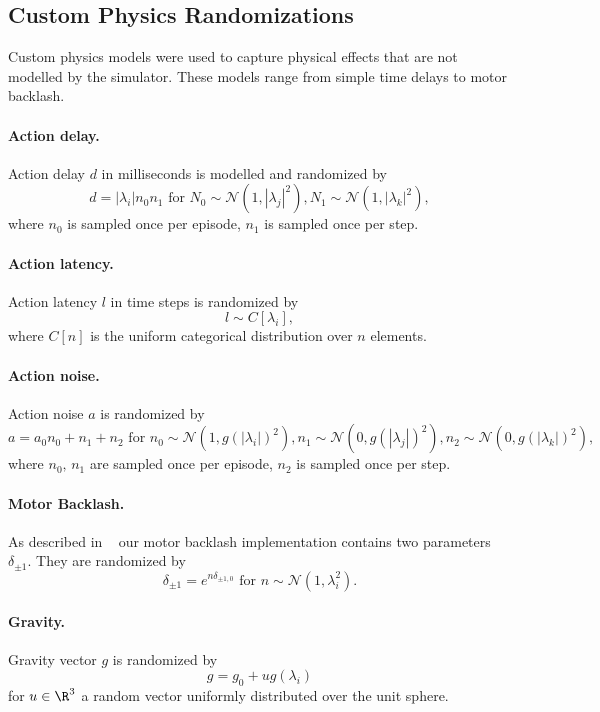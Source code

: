 \subsection{Custom Physics Randomizations}\label{sec:custom_physics}
Custom physics models were used to capture physical effects that are not modelled by the simulator. These models range from simple time delays to motor backlash.

\paragraph{Action delay.} Action delay $d$ in milliseconds is modelled and randomized by
\[
d = |\lambda_i| n_0 n_1 \textrm{ for } N_0 \sim \mathcal{N}(1, |\lambda_j|^2), N_1 \sim \mathcal{N}(1, |\lambda_k|^2),
\]
where $n_0$ is sampled once per episode, $n_1$ is sampled once per step.

\paragraph{Action latency.} Action latency $l$ in time steps is randomized by
\[
l \sim C[\lambda_i],
\]
where $C[n]$ is the uniform categorical distribution over $n$ elements.

\paragraph{Action noise.} Action noise $a$ is randomized by 
\[
a = a_0n_0 + n_1 + n_2 \textrm{ for } n_0 \sim \mathcal{N}(1, g(|\lambda_i|)^2), n_1 \sim \mathcal{N}(0, g(|\lambda_j|)^2), n_2 \sim \mathcal{N}(0, g(|\lambda_k|)^2),
\]
where $n_0,\, n_1$ are sampled once per episode, $n_2$ is sampled once per step.

\paragraph{Motor Backlash.} As described in ~\citep[C.2]{openai2018learning} our motor backlash implementation contains two parameters $\delta_{\pm 1}$. They are randomized by 
\[
\delta_{\pm1} = e^{n\delta_{\pm1, 0}} \textrm{ for } n \sim \mathcal{N}(1, \lambda_i^2).
\]

\paragraph{Gravity.} Gravity vector $g$ is randomized by
\[
g = g_0 + ug(\lambda_i)
\]
for $u \in \R^3$ a random vector uniformly distributed over the unit sphere.

